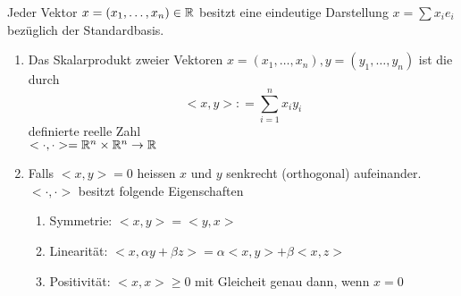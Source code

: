 Jeder Vektor $x=\left(x_1,\dots,x_n \right)\in\mathbb{R}$ besitzt eine eindeutige Darstellung $x=\sum x_ie_i$ bezüglich der Standardbasis.
\begin{definition}{2.16}
\vspace{-6mm}
\begin{enumerate}
\item Das Skalarprodukt zweier Vektoren $x=\left(x_1,\dots,x_n \right),y=\left(y_1,\dots,y_n \right)$ ist die durch \[ < x,y > : = \sum\limits_{i = 1}^n {{x_i}{y_i}} \] definierte reelle Zahl\\ $<\cdot,\cdot>=\mathbb{R}^n\times\mathbb{R}^n\to\mathbb{R}$ 
\item Falls $<x,y>=0$ heissen $x$ und $y$ senkrecht (orthogonal) aufeinander. $<\cdot,\cdot>$ besitzt folgende Eigenschaften
\begin{enumerate}
\item Symmetrie: $<x,y>=<y,x>$
\item Linearität: $<x,\alpha y+\beta z>=\alpha <x,y>+\beta <x,z>$
\item Positivität: $<x,x>\geq 0$ mit Gleicheit genau dann, wenn $x=0$
\end{enumerate}
\end{enumerate}
\end{definition}

